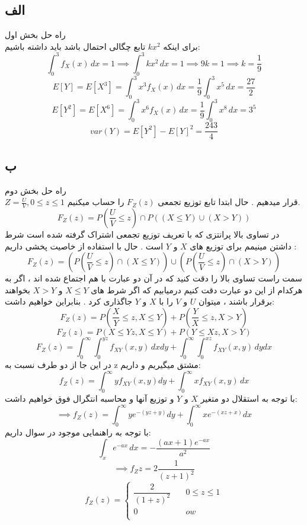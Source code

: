 \subsection*{الف}
راه حل بخش اول  \\
 برای اینکه 
$kx^2$
تابع چگالی احتمال باشد باید داشته باشیم:
$$
\int_{0}^{3}f_X(x) \, dx = 1 \implies \int_{0}^{3}kx^2 \, dx = 1 \implies 9k = 1 \implies k = \dfrac{1}{9}
$$
$$
E[Y] = E[X^3] = \int_{0}^{3} x^3f_X(x) \, dx = \dfrac{1}{9} \int_{0}^{3} x^5 \, dx = \dfrac {27}{2}
$$
$$
E[Y^2] = E[X^6] = \int_{0}^{3}x^6f_X(x) \, dx = \dfrac{1}{9} \int_{0}^{3}x^8 \, dx = 3^5
$$
$$
var(Y) = E[Y^2] - E[Y]^2 = \dfrac{243}{4}
$$
\subsection*{ب}
راه حل بخش دوم  \\
$Z = \frac{U}{V}  ,   0 \leq z \leq 1  $ 
قرار میدهیم . حال ابتدا تابع توزیع تجمعی  
$F_Z(z)$
 را حساب میکنیم.
$$
F_Z(z)=P({\dfrac{U}{V}}  \leq z )  \cap  P( ( X \leq Y) \cup (X  > Y))
$$
 در تساوی بالا پرانتزی که با تعریف توزیع تجمعی اشتراک گرفته شده است شرط داشتن مینیمم برای توزیع های $X$ و $Y$ است .  حال با استفاده از خاصیت پخشی داریم :
$$
F_Z(z)= (P({\dfrac{U}{V}}  \leq z ) \cap  ( X \leq Y) ) \cup  (P({\dfrac{U}{V}}  \leq z ) \cap  ( X > Y) )
$$
سمت راست تساوی بالا را دقت کنید که در آن دو عبارت با هم اجتماع شده اند ، اگر به هرکدام از این دو عبارت دقت کنیم درمیابیم که اگر شرط های 
$X \leq Y$ و 
$X > Y$
 بخواهند برقرار باشند ، میتوان $U$ و $V$ را با $X$ و $Y$ جاگذاری کرد . بنابراین خواهیم داشت:
$$
F_Z(z)=P({\dfrac{X}{Y}} \leq z , X \leq Y) + P ( {\dfrac{Y}{X}} \leq z , X > Y)
$$
$$
F_Z(z)=P(X \leq Yz , X \leq Y ) + P( Y \leq Xz, X > Y)
$$
$$
F_Z(z)=\int_{0}^{\infty} \int_{0}^{yz}f_{XY}(x,y) \, dxdy + \int_{0}^{\infty} \int_{0}^{xz}f_{XY}(x,y) \, dydx
$$
در این جا از دو طرف نسبت به z مشتق میگیریم و داریم:
$$
f_Z(z) = \int_{0}^{\infty}yf_{XY}(x, y)dy + \int_{0}^{\infty}xf_{XY}(x, y)\, dx  
$$
با توجه به استقلال دو متغیر $X$ و $Y$ و توزیع آنها و محاسبه انتگرال فوق خواهیم داشت:
$$
  \implies f_Z(z) = \int_{0}^{\infty}ye^{-(yz + y)}dy + \int_{0}^{\infty}xe^{-(xz + x)}dx
$$
 با توجه به راهنمایی موجود در سوال داریم:
$$
\int_xe^{-ax}\, dx = -\dfrac{(ax+1)e^{-ax}}{a^2}
$$
$$
\implies f_Z{z} = 2\dfrac{1}{(z + 1)^2}
$$
$$
f_Z(z) = \begin{cases}
	\dfrac{2}{(1 + z) ^2} & \quad 0 \leq z \leq 1 \\
	0 & \quad ow \\
\end{cases}
$$
